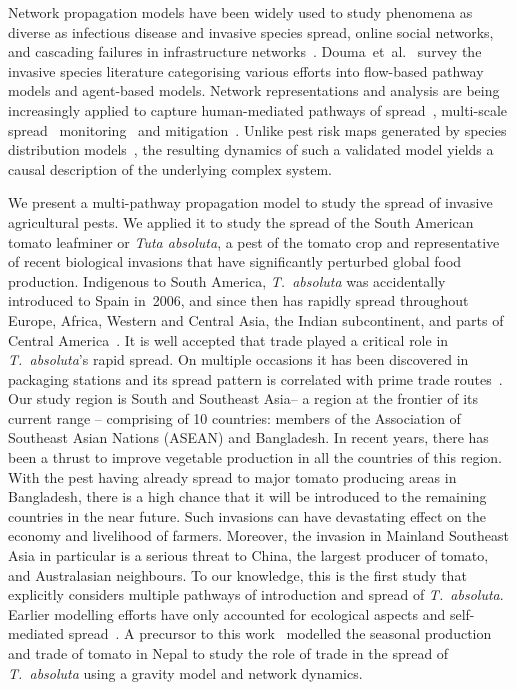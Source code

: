 \documentclass[11pt]{article}
\newcommand{\tuta}{\emph{T.~absoluta}}
\theoremstyle{definition}
\begin{document}
Network propagation models have been widely used to study phenomena as
diverse as infectious disease and invasive species spread, online social
networks, and cascading failures in infrastructure
networks~\cite{barrat2008dynamical}. Douma~et~al.~\cite{douma2016pathway}
survey the invasive species literature categorising various efforts into
flow-based pathway models and agent-based models. Network representations
and analysis are being increasingly applied to capture human-mediated
pathways of spread~\cite{nopsa2015ecological,carrasco2010unveiling},
multi-scale spread~\cite{wildemeersch2019modelling}
monitoring~\cite{martinetti2019identifying} and
mitigation~\cite{strona2017network}. Unlike pest risk maps generated by
species distribution models~\cite{pearson2007species}, the resulting
dynamics of such a validated model yields a causal description of the
underlying complex system.

We present a multi-pathway propagation model to study the spread of
invasive agricultural pests. We applied it to study the spread of the South
American tomato leafminer or \emph{Tuta absoluta}, a pest of the tomato
crop and representative of recent biological invasions that have
significantly perturbed global food production. Indigenous to South
America, \tuta{} was accidentally introduced to Spain in~2006, and since
then has rapidly spread throughout Europe, Africa, Western and Central
Asia, the Indian subcontinent, and parts of Central
America~\cite{desneux2010biological,biondi2017}. It is well accepted that
trade played a critical role in \tuta{}'s rapid spread. On multiple
occasions it has been discovered in packaging stations and its spread
pattern is correlated with prime trade routes~\cite{karadjova2013tuta}. Our
study region is South and Southeast Asia-- a region at the frontier of its
current range -- comprising of 10 countries: members of the Association of
Southeast Asian Nations (ASEAN) and Bangladesh. In recent years, there has
been a thrust to improve vegetable production in all the countries of this
region. With the pest having already spread to major tomato producing areas
in Bangladesh, there is a high chance that it will be introduced to the
remaining countries in the near future. Such invasions can have devastating
effect on the economy and livelihood of farmers. Moreover, the invasion in
Mainland Southeast Asia in particular is a serious threat to China, the
largest producer of tomato, and Australasian neighbours. To our knowledge,
this is the first study that explicitly considers multiple pathways of
introduction and spread of \tuta{}. Earlier modelling efforts have only
accounted for ecological aspects and self-mediated
spread~\cite{desneux2010biological,tonnang2015identification,guimapi2016modeling}.
A precursor to this work~\cite{venkatramanan2019modeling} modelled the
seasonal production and trade of tomato in Nepal to study the role of trade
in the spread of \tuta{} using a gravity model and network dynamics.
\end{document}
